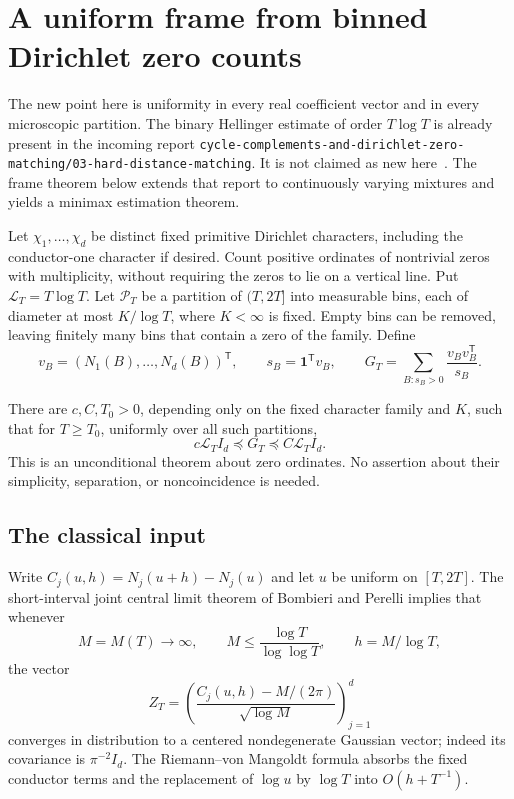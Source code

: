 \section{A uniform frame from binned Dirichlet zero counts}

The new point here is uniformity in every real coefficient vector and in every
microscopic partition.  The binary Hellinger estimate of order $T\log T$ is
already present in the incoming report
\texttt{cycle-complements-and-dirichlet-zero-matching/03-hard-distance-matching}.
It is not claimed as new here~\cite{BinaryIncoming}.  The frame theorem below extends that report
to continuously varying mixtures and yields a minimax estimation theorem.

Let $\chi_1,\ldots,\chi_d$ be distinct fixed primitive Dirichlet characters,
including the conductor-one character if desired.  Count positive ordinates
of nontrivial zeros with multiplicity, without requiring the zeros to lie on
a vertical line.  Put $\mathcal L_T=T\log T$.  Let $\mathcal P_T$ be a
partition of $(T,2T]$ into measurable bins, each of diameter at most
$K/\log T$, where $K<\infty$ is fixed.  Empty bins can be removed, leaving
finitely many bins that contain a zero of the family.  Define
\[
 v_B=(N_1(B),\ldots,N_d(B))^{\mathsf T},\qquad
 s_B=\boldsymbol 1^{\mathsf T}v_B,
 \qquad
 G_T=\sum_{B:s_B>0}\frac{v_Bv_B^{\mathsf T}}{s_B}.
\]

\begin{theorem}\label{mix:thm:frame}
There are $c,C,T_0>0$, depending only on the fixed character family and $K$,
such that for $T\ge T_0$, uniformly over all such partitions,
\[
 c\mathcal L_T I_d\preceq G_T\preceq C\mathcal L_T I_d.
\tag{MF1}
\]
This is an unconditional theorem about zero ordinates.  No assertion about
their simplicity, separation, or noncoincidence is needed.
\end{theorem}

\subsection{The classical input}

Write $C_j(u,h)=N_j(u+h)-N_j(u)$ and let $u$ be uniform on $[T,2T]$.
The short-interval joint central limit theorem of Bombieri and Perelli
\cite[Theorem 2]{BP1998} implies that whenever
\[
 M=M(T)\longrightarrow\infty,\qquad
 M\le\frac{\log T}{\log\log T},\qquad h=M/\log T,
\]
the vector
\[
 Z_T=\left(\frac{C_j(u,h)-M/(2\pi)}{\sqrt{\log M}}\right)_{j=1}^d
\tag{MF2}
\]
converges in distribution to a centered nondegenerate Gaussian vector;
indeed its covariance is $\pi^{-2}I_d$.  The Riemann--von Mangoldt formula
absorbs the fixed conductor terms and the replacement of $\log u$ by
$\log T$ into $O(h+T^{-1})$.


